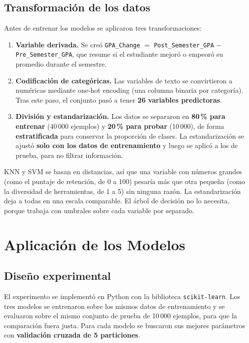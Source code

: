 \documentclass[11pt,letterpaper,twoside]{article}
\begin{document}
\subsection{Transformación de los datos}
Antes de entrenar los modelos se aplicaron tres transformaciones:

\begin{enumerate}[leftmargin=*]
  \item \textbf{Variable derivada.} Se creó \texttt{GPA\_Change} $=$ \texttt{Post\_Semester\_GPA} $-$ \texttt{Pre\_Semester\_GPA}, que resume si el estudiante mejoró o empeoró su promedio durante el semestre.
  \item \textbf{Codificación de categóricas.} Las variables de texto se convirtieron a numéricas mediante one-hot encoding (una columna binaria por categoría). Tras este paso, el conjunto pasó a tener \textbf{26 variables predictoras}.
  \item \textbf{División y estandarización.} Los datos se separaron en \textbf{80\,\% para entrenar} (40\,000 ejemplos) y \textbf{20\,\% para probar} (10\,000), de forma \textbf{estratificada} para conservar la proporción de clases. La estandarización se ajustó \textbf{solo con los datos de entrenamiento} y luego se aplicó a los de prueba, para no filtrar información.
\end{enumerate}

\begin{nota}
KNN y SVM se basan en distancias, así que una variable con números grandes (como el puntaje de retención, de 0 a 100) pesaría más que otra pequeña (como la diversidad de herramientas, de 1 a 5) sin ninguna razón. La estandarización deja a todas en una escala comparable. El árbol de decisión no lo necesita, porque trabaja con umbrales sobre cada variable por separado.
\end{nota}

\section{Aplicación de los Modelos}
\label{sec:modelos}

\subsection{Diseño experimental}
El experimento se implementó en Python con la biblioteca \texttt{scikit-learn}. Los tres modelos se entrenaron sobre los mismos datos de entrenamiento y se evaluaron sobre el mismo conjunto de prueba de 10\,000 ejemplos, para que la comparación fuera justa. Para cada modelo se buscaron sus mejores parámetros con \textbf{validación cruzada de 5 particiones}.
\end{document}

